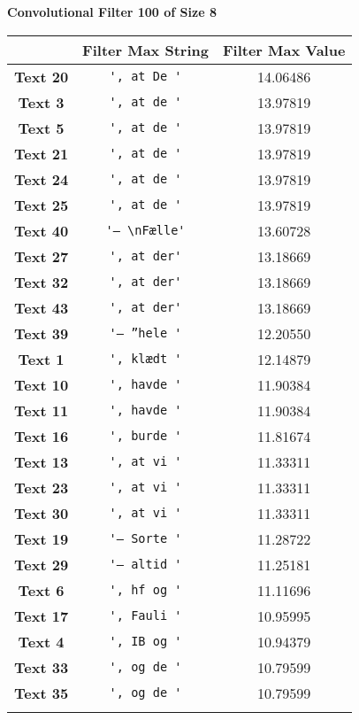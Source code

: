 \textbf{Convolutional Filter 100 of Size 8}\par\medskip
\begin{tabular}{c|cc}
    & \textbf{Filter Max String} & \textbf{Filter Max Value} \\ \hline
    \textbf{Text 20} & \verb{', at De '{ & 14.06486 \\
    \textbf{Text 3} & \verb{', at de '{ & 13.97819 \\
    \textbf{Text 5} & \verb{', at de '{ & 13.97819 \\
    \textbf{Text 21} & \verb{', at de '{ & 13.97819 \\
    \textbf{Text 24} & \verb{', at de '{ & 13.97819 \\
    \textbf{Text 25} & \verb{', at de '{ & 13.97819 \\
    \textbf{Text 40} & \verb{'– \nFælle'{ & 13.60728 \\
    \textbf{Text 27} & \verb{', at der'{ & 13.18669 \\
    \textbf{Text 32} & \verb{', at der'{ & 13.18669 \\
    \textbf{Text 43} & \verb{', at der'{ & 13.18669 \\
    \textbf{Text 39} & \verb{'– ”hele '{ & 12.20550 \\
    \textbf{Text 1} & \verb{', klædt '{ & 12.14879 \\
    \textbf{Text 10} & \verb{', havde '{ & 11.90384 \\
    \textbf{Text 11} & \verb{', havde '{ & 11.90384 \\
    \textbf{Text 16} & \verb{', burde '{ & 11.81674 \\
    \textbf{Text 13} & \verb{', at vi '{ & 11.33311 \\
    \textbf{Text 23} & \verb{', at vi '{ & 11.33311 \\
    \textbf{Text 30} & \verb{', at vi '{ & 11.33311 \\
    \textbf{Text 19} & \verb{'– Sorte '{ & 11.28722 \\
    \textbf{Text 29} & \verb{'– altid '{ & 11.25181 \\
    \textbf{Text 6} & \verb{', hf og '{ & 11.11696 \\
    \textbf{Text 17} & \verb{', Fauli '{ & 10.95995 \\
    \textbf{Text 4} & \verb{', IB og '{ & 10.94379 \\
    \textbf{Text 33} & \verb{', og de '{ & 10.79599 \\
    \textbf{Text 35} & \verb{', og de '{ & 10.79599 \\
}}}}}}}}}}}}}}}}}}}}}}}}}
\end{tabular}
